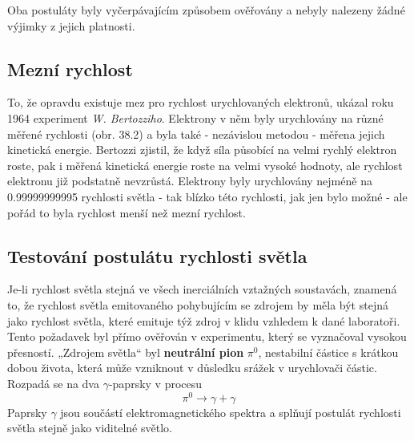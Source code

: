         Oba postuláty byly vyčerpávajícím způsobem ověřovány a nebyly nalezeny žádné výjimky z
        jejich platnosti.
      
      \subsection{Mezní rychlost}
        To, že opravdu existuje mez pro rychlost urychlovaných elektronů, ukázal roku 1964
        experiment \emph{W. Bertozziho}. Elektrony v něm byly urychlovány na různé měřené rychlosti
        (obr. 38.2) a byla také - nezávislou metodou - měřena jejich kinetická energie. Bertozzi
        zjistil, že když síla působící na velmi rychlý elektron roste, pak i měřená kinetická
        energie roste na velmi vysoké hodnoty, ale rychlost elektronu již podstatně nevzrůstá.
        Elektrony byly urychlovány nejméně na \num{0.999 999 999 95} rychlosti světla - tak blízko
        této rychlosti, jak jen bylo možné - ale pořád to byla rychlost menší než mezní rychlost.


      \subsection{Testování postulátu rychlosti světla}  
        Je-li rychlost světla stejná ve všech inerciálních vztažných soustavách, znamená to, že
        rychlost světla emitovaného pohybujícím se zdrojem by měla být stejná jako rychlost světla,
        které emituje týž zdroj v klidu vzhledem k dané laboratoři. Tento požadavek byl přímo
        ověřován v experimentu, který se vyznačoval vysokou přesností. „Zdrojem světla“ byl
        \textbf{neutrální pion} \(\pi^0\), nestabilní částice s krátkou dobou života, která může
        vzniknout v důsledku srážek v urychlovači částic. Rozpadá se na dva \(\gamma\)-paprsky v
        procesu
        \begin{equation*}
          \pi^0 \rightarrow \gamma + \gamma
        \end{equation*}
        Paprsky \(\gamma\) jsou součástí elektromagnetického spektra a splňují postulát rychlosti
        světla stejně jako viditelné světlo.

